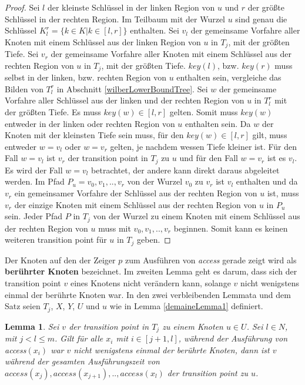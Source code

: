 \documentclass[a4paper,12pt]{article}
\newtheorem{Lemma}{Lemma}[section]
\begin{document}
\begin{proof}
	Sei $l$ der kleinste Schlüssel in der linken Region von $u$ und $r$ der größte Schlüssel in der rechten Region. Im Teilbaum mit der Wurzel $u$ sind genau die Schlüssel $K^r_l = \{k \in K \vert k \in \left[l,r\right]\}$ enthalten. Sei $v_l$ der gemeinsame Vorfahre aller Knoten mit einem Schlüssel aus der linken Region von $u$ in $T_j$, mit der größten Tiefe. Sei $v_r$ der gemeinsame Vorfahre aller Knoten mit einem Schlüssel aus der rechten Region von $u$ in $T_j$, mit der größten Tiefe. $\mathit{key\left(l\right)}$, bzw. $\mathit{key\left(r\right)}$ muss selbst in der linken, bzw. rechten Region von $u$ enthalten sein, vergleiche das Bilden von $T^r_l$ in Abschnitt \ref{wilberLowerBoundTree}. Sei $w$ der gemeinsame Vorfahre aller Schlüssel aus der linken und der rechten Region von $u$ in $T^r_l$ mit der größten Tiefe. Es muss $\mathit{key}\left(w\right) \in \left[l,r\right]$ gelten. Somit muss  $\mathit{key}\left(w\right)$ entweder in der linken oder rechten Region von $u$ enthalten sein. Da $w$ der Knoten mit der kleinsten Tiefe sein muss, für den  $\mathit{key\left(w\right)} \in \left[l,r\right]$  gilt, muss entweder $w = v_l$ oder $w = v_r$ gelten, je nachdem wessen Tiefe kleiner ist. Für den Fall $w = v_l$ ist $v_r$ der transition point in $T_j$ zu $u$ und für den Fall $w = v_r$ ist es $v_l$.
	Es wird der Fall $w = v_l$ betrachtet, der andere kann direkt daraus abgeleitet werden. Im Pfad $P_u = v_0,v_1,..,v_r$ von der Wurzel $v_0$ zu $v_r$ ist $v_l$ enthalten und da $v_r$ ein gemeinsamer Vorfahre der Schlüssel aus der rechten Region von $u$ ist, muss $v_r$ der einzige Knoten mit einem Schlüssel aus der rechten Region von $u$ in $P_u$ sein. Jeder Pfad $P$ in $T_j$ von der Wurzel zu einem Knoten mit einem Schlüssel aus der rechten Region von $u$ muss mit $v_0,v_1,..,v_r$ beginnen. Somit kann es keinen weiteren transition point für $u$ in $T_j$ geben. 
	
\end{proof}
\noindent Der Knoten auf den der Zeiger $p$ zum Ausführen von \textit{access} gerade zeigt wird als \textbf{berührter Knoten} bezeichnet.
Im zweiten Lemma geht es darum, dass sich der transition point $v$ eines Knotens nicht verändern kann, solange $v$ nicht wenigstens einmal der berührte Knoten war. In den zwei verbleibenden Lemmata und dem Satz seien  $T_j$, $X$, $Y$, $U$ und $u$ wie in  Lemma \ref{demaineLemma1} definiert. 



\begin{Lemma} \label{demaineLemma2} \label{lemmaDemaine2}
 Sei $v$ der transition point in $T_j$ zu einem Knoten $u \in U$.  Sei  \mbox{$l \in \mathit{N}$}, mit \mbox{$j < l \leq m$}. Gilt für alle $x_i$ mit $i \in \left[j + 1,l\right]$, während der Ausführung von \textit{access}$\left(x_i\right)$ war  $v$  nicht wenigstens einmal der berührte Knoten, dann ist $v$ während der gesamten Ausführungszeit von\\ $\textit{access}\left(x_j\right),\textit{access}\left(x_{j+1}\right),..,\textit{access}\left(x_l\right)$ der transition point zu $u$. 
\end{Lemma}
\end{document}
